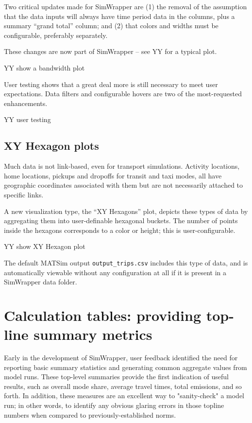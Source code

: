 \documentclass[3p,times,procedia]{elsarticle}
\begin{document}
Two critical updates made for SimWrapper are (1) the removal of the
assumption that the data inputs will always have time period data in the
columns, plus a summary ``grand total'' column; and (2) that colors and
widths must be configurable, preferably separately.

These changes are now part of SimWrapper -- see YY for a typical plot.

YY show a bandwidth plot

User testing shows that a great deal more is still necessary to meet
user expectations. Data filters and configurable hovers are two of the
most-requested enhancements.

YY user testing


\subsection{XY Hexagon plots}

Much data is not link-based, even for transport simulations. Activity locations, home locations, pickups and dropoffs for transit and taxi modes, all have geographic coordinates associated with them but are not necessarily attached to specific links.

A new visualization type, the ``XY Hexagons'' plot, depicts these types of data by aggregating them into user-definable hexagonal buckets. The number of points inside the hexagons corresponds to a color or height; this is user-configurable.

YY show XY Hexagon plot

The default MATSim output \texttt{output\_trips.csv} includes this type of data, and is automatically viewable without any configuration at all if it is present in a SimWrapper data folder.


\section{Calculation tables: providing top-line summary metrics}

Early in the development of SimWrapper, user feedback identified the need for reporting basic summary statistics and generating common aggregate values from model runs. These top-level summaries provide the first indication of useful results, such as overall mode share, average travel times, total emissions, and so forth. In addition, these measures are an excellent way to "sanity-check" a model run; in other words, to identify any obvious glaring errors in those topline numbers when compared to previously-established norms.
\end{document}
